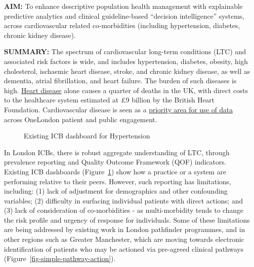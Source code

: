 \documentclass[
  letterpaper,
  DIV=11,
  numbers=noendperiod]{scrartcl}
\begin{document}
\textbf{AIM:} To enhance descriptive population health management with
explainable predictive analytics and clinical guideline-based ``decision
intelligence'' systems, across cardiovascular related co-morbidities
(including hypertension, diabetes, chronic kidney disease).

\textbf{SUMMARY:} The spectrum of cardiovascular long-term conditions
(LTC) and associated risk factors is wide, and includes hypertension,
diabetes, obesity, high cholesterol, ischaemic heart disease, stroke,
and chronic kidney disease, as well as dementia, atrial fibrillation,
and heart failure. The burden of such diseases is high.
\href{https://cks.nice.org.uk/topics/cvd-risk-assessment-management/background-information/burden-of-cvd/}{Heart
disease} alone causes a quarter of deaths in the UK, with direct costs
to the healthcare system estimated at £9 billion by the British Heart
Foundation. Cardiovascular disease is seen as a
\href{https://imperialcollegehealthpartners.com/portfolio/onelondon/}{priority
area for use of data} across OneLondon patient and public engagement.

\begin{figure}


\caption{\label{fig-icb-hypertension}Existing ICB dashboard for
Hypertension}

\end{figure}%

In London ICBs, there is robust aggregate understanding of LTC, through
prevalence reporting and Quality Outcome Framework (QOF) indicators.
Existing ICB dashboards (Figure~\ref{fig-icb-hypertension}) show how a
practice or a system are performing relative to their peers. However,
such reporting has limitations, including: (1) lack of adjustment for
demographics and other confounding variables; (2) difficulty in
surfacing individual patients with direct actions; and (3) lack of
consideration of co-morbidities - as multi-morbidity tends to change the
risk profile and urgency of response for individuals. Some of these
limitations are being addressed by existing work in London pathfinder
programmes, and in other regions such as Greater Manchester, which are
moving towards electronic identification of patients who may be actioned
via pre-agreed clinical pathways
(Figure~\ref{fig-simple-pathway-action}).
\end{document}
